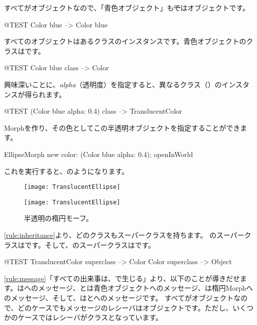 \documentclass[a4paper,10pt,twoside]{book}
\begin{document}
すべてがオブジェクトなので、「青色オブジェクト」も\st ではオブジェクトです。
\begin{code}{@TEST}
Color blue --> Color blue
\end{code}

\noindent
すべてのオブジェクトはあるクラスのインスタンスです。青色オブジェクトのクラスはです。
\begin{code}{@TEST}
Color blue class --> Color
\end{code}

\noindent
興味深いことに、\emph{alpha}（透明度）を指定すると、異なるクラス（）のインスタンスが得られます。
\begin{code}{@TEST}
(Color blue alpha: 0.4) class --> TranslucentColor
\end{code}

\noindent
Morphを作り、その色としてこの半透明オブジェクトを指定することができます。
\begin{code}{}
EllipseMorph new color: (Color blue alpha: 0.4); openInWorld
\end{code}
\noindent
これを実行すると、のようになります。

\begin{center}
\begin{figure}[!ht]
\ifluluelse
	{\centerline {\texttt{[image: TranslucentEllipse]}}}
	{\centerline {\texttt{[image: TranslucentEllipse]}}}
\caption{半透明の楕円モーフ。}
\end{figure}
\end{center}

\ref{rule:inheritance}より、どのクラスもスーパークラスを持ちます。
のスーパークラスはです。そして、のスーパークラスはです。
\begin{code}{@TEST}
TranslucentColor superclass --> Color
Color superclass                   --> Object
\end{code}

\ref{rule:message}「すべての出来事は、で生じる」より、以下のことが導きだせます。はへのメッセージ、とは青色オブジェクトへのメッセージ、は楕円Morphへのメッセージ、そして、はとへのメッセージです。
すべてがオブジェクトなので、どのケースでもメッセージのレシーバはオブジェクトです。ただし、いくつかのケースではレシーバがクラスとなっています。
\end{document}
